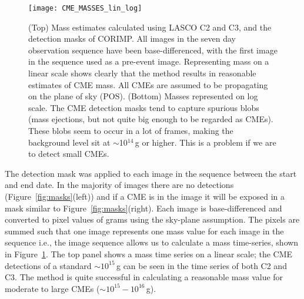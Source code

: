 \begin{figure}[t!]
\begin{center}
\texttt{[image: CME\_MASSES\_lin\_log]}
\caption[CME Mass automatic detection]{(Top) Mass estimates calculated using LASCO C2 and C3, and the detection masks of CORIMP. All images in the seven day observation sequence have been base-differenced, with the first image in the sequence used as a pre-event image. Representing mass on a linear scale shows clearly that the method results in reasonable estimates of CME mass. All CMEs are assumed to be propagating on the plane of sky (POS). 
(Bottom) Masses represented on log scale. The CME detection masks tend to capture spurious blobs (mass ejections, but not quite big enough to be regarded as CMEs). These blobs seem to occur in a lot of frames, making the background level sit at $\sim$10$^{14}$\,g or higher. This is a problem if we are to detect small CMEs.}
\label{fig:mass_v_time}
\end{center}
\end{figure}

The detection mask was applied to each image in the sequence between the start and end date. In the majority of images there are no detections (Figure~\ref{fig:masks}(left)) and if a CME is in the image it will be exposed in a mask similar to Figure~\ref{fig:masks}(right). Each image is base-differenced and converted to pixel values of grams using the sky-plane assumption. The pixels are summed such that one image represents one mass value for each image in the sequence i.e., the image sequence allows us to calculate a mass time-series, shown in Figure~\ref{fig:mass_v_time}. The top panel shows a mass time series on a linear scale; the CME detections of a standard $\sim$$10^{15}$\,g can be seen in the time series of both C2 and C3. The method is quite successful in calculating a reasonable mass value for moderate to large CMEs ($\sim$$10^{15}-10^{16}$\,g). 
%

